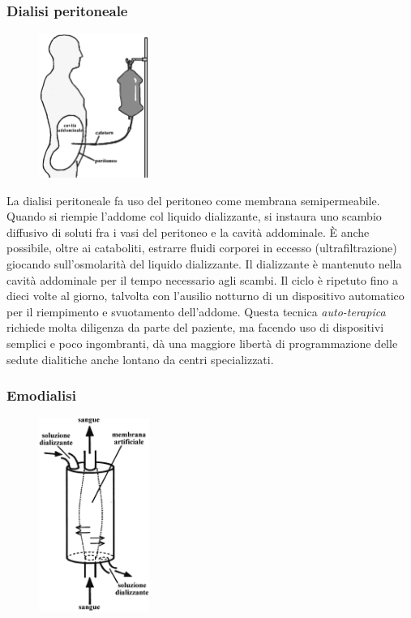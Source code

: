\subsubsection{Dialisi peritoneale}
\begin{figure}
	\centering
	\vspace{-20pt}
		\includegraphics[width=0.32\textwidth]{immagini/peritoneale.eps}
		\vspace{-20pt}
\end{figure}
La dialisi peritoneale fa uso del peritoneo come membrana semipermeabile. Quando si riempie l'addome col liquido dializzante, si instaura uno scambio diffusivo di soluti fra i vasi del peritoneo e la cavità addominale. È anche possibile, oltre ai cataboliti, estrarre fluidi corporei in eccesso (ultrafiltrazione) giocando sull'osmolarità del liquido dializzante. Il dializzante è mantenuto nella cavità addominale per il tempo necessario agli scambi. Il ciclo è ripetuto fino a dieci volte al giorno, talvolta con l'ausilio notturno di un dispositivo automatico per il riempimento e svuotamento dell'addome. Questa tecnica \textit{auto-terapica} richiede molta diligenza da parte del paziente, ma facendo uso di dispositivi semplici e poco ingombranti, dà una maggiore libertà di programmazione delle sedute dialitiche anche lontano da centri specializzati.
 

\subsubsection{Emodialisi}

\begin{figure}
	\centering
	\vspace{-20pt}
		\includegraphics[width=0.32\textwidth]{immagini/emod.eps}
		\vspace{-20pt}
\end{figure}

